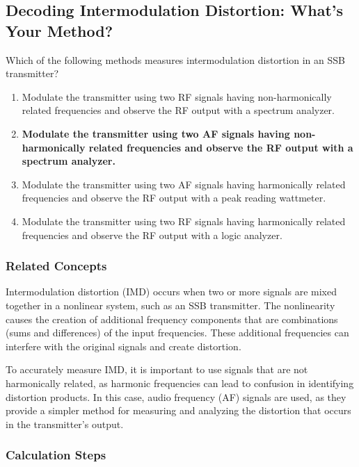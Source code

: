 \subsection{Decoding Intermodulation Distortion: What’s Your Method?}

\begin{tcolorbox}[colback=gray!10, colframe=black, title=E4B10]

Which of the following methods measures intermodulation distortion in an SSB transmitter?
\begin{enumerate}[label=\Alph*.]
    \item Modulate the transmitter using two RF signals having non-harmonically related frequencies and observe the RF output with a spectrum analyzer.
    \item \textbf{Modulate the transmitter using two AF signals having non-harmonically related frequencies and observe the RF output with a spectrum analyzer.}
    \item Modulate the transmitter using two AF signals having harmonically related frequencies and observe the RF output with a peak reading wattmeter.
    \item Modulate the transmitter using two RF signals having harmonically related frequencies and observe the RF output with a logic analyzer.
\end{enumerate} \end{tcolorbox}

\subsubsection{Related Concepts}

Intermodulation distortion (IMD) occurs when two or more signals are mixed together in a nonlinear system, such as an SSB transmitter. The nonlinearity causes the creation of additional frequency components that are combinations (sums and differences) of the input frequencies. These additional frequencies can interfere with the original signals and create distortion.

To accurately measure IMD, it is important to use signals that are not harmonically related, as harmonic frequencies can lead to confusion in identifying distortion products. In this case, audio frequency (AF) signals are used, as they provide a simpler method for measuring and analyzing the distortion that occurs in the transmitter's output.

\subsubsection{Calculation Steps}

